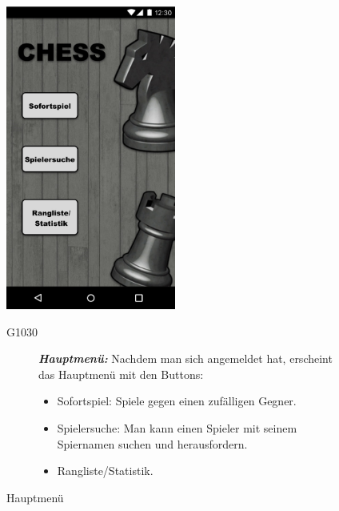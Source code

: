 \documentclass[parskip=full]{scrartcl}
\begin{document}
\begin{figure}[htp]
	\begin{minipage}[t]{6cm}
		\vspace{0pt}
		\includegraphics[height=100mm]{hauptmenu.png}
		\caption{Hauptmenü}
		\label{fig:Hauptmenü}
	\end{minipage}
	\hfill
	\begin{minipage}[t]{6cm}
		\vspace{0pt}
		\begin{description}
			\item[G1030] \textbf{\textit{Hauptmenü: }} Nachdem man sich angemeldet hat, erscheint das Hauptmenü mit den Buttons:
			\begin{itemize}			
			\item Sofortspiel: Spiele gegen einen zufälligen Gegner.
			\item Spielersuche: Man kann einen Spieler mit seinem Spiernamen suchen und herausfordern.
			\item Rangliste/Statistik.
			\end{itemize}
		\end{description}
	\end{minipage}


\end{figure}
\end{document}
